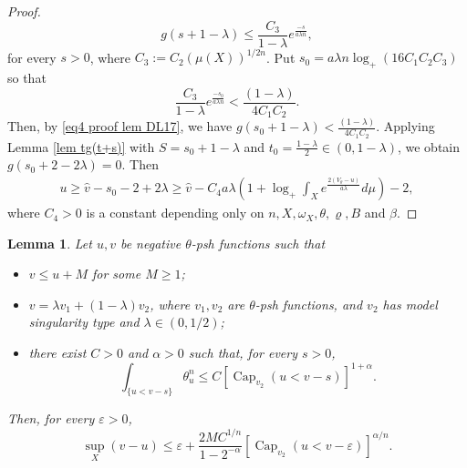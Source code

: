 \documentclass[a4paper,11pt]{amsart}
\numberwithin{equation}{section}
\newtheorem{lemma}[theorem]{Lemma}
\theoremstyle{definition}
\newcommand{\capacity}{\mathop{\mathrm{Cap}}\nolimits}
\begin{document}
\begin{proof}
\begin{equation}
	g(s+1-\lambda)\leq\dfrac{C_3}{1-\lambda} e^{\frac{-s}{a\lambda n}},
\end{equation}
for every $s>0$, where $C_3:=C_2(\mu(X))^{1/2n}$. Put
	$s_0=a\lambda n \log_+ (16C_1C_2C_3)$ so that
$$\frac{C_3}{1-\lambda} e^{\frac{-s_0}{a\lambda n}}<\frac{(1-\lambda)}{4C_1C_2}.$$
Then, by \eqref{eq4 proof lem DL17}, we have $g(s_0+1-\lambda)<\frac{(1-\lambda)}{4C_1C_2}$. 
Applying Lemma \ref{lem tg(t+s)} with $S=s_0+1-\lambda$ and $t_0=\frac{1-\lambda}{2}\in (0, 1-\lambda)$, we obtain
$g(s_0+2-2\lambda)=0$. Then
\begin{align*}
	u\geq\widehat{v}-s_0-2+2\lambda\geq \widehat{v}
	-C_4 a\lambda \left(1+\log_+\int_Xe^{\frac{2(V_\theta-u)}{a\lambda}}d\mu\right)-2,
\end{align*}
where $C_4>0$ is a constant depending only on $n, X, \omega_X, \theta, \varrho, B$ and $\beta$.
\end{proof}
\begin{lemma}\label{lem sup<cap}
		Let $u, v$ be negative $\theta$-psh functions such that
	\begin{itemize}
		\item $v\leq u+M$ for some $M\geq 1$;
		\item $v=\lambda v_1+(1-\lambda) v_2$, where  $v_1, v_2$ are $\theta$-psh functions, and $v_2$ has model singularity type and $\lambda\in (0, 1/2)$;
		\item there exist $C>0$ and $\alpha>0$ such that, for every $s>0$,
		\begin{equation}\label{eq0lemsup<cap}
			\int_{\{u<v-s\}}\theta_u^n\leq C[\capacity_{v_2}(u<v-s)]^{1+\alpha}.
		\end{equation}
		\end{itemize}
	Then, for every $\varepsilon>0$,
	\begin{equation*}
		\sup_{X }(v-u)\leq \varepsilon+\dfrac{2MC^{1/n}}{1-2^{-\alpha}}[\capacity_{v_2}(u<v-\varepsilon)]^{\alpha/n}.
	\end{equation*}
\end{lemma}
\end{document}
